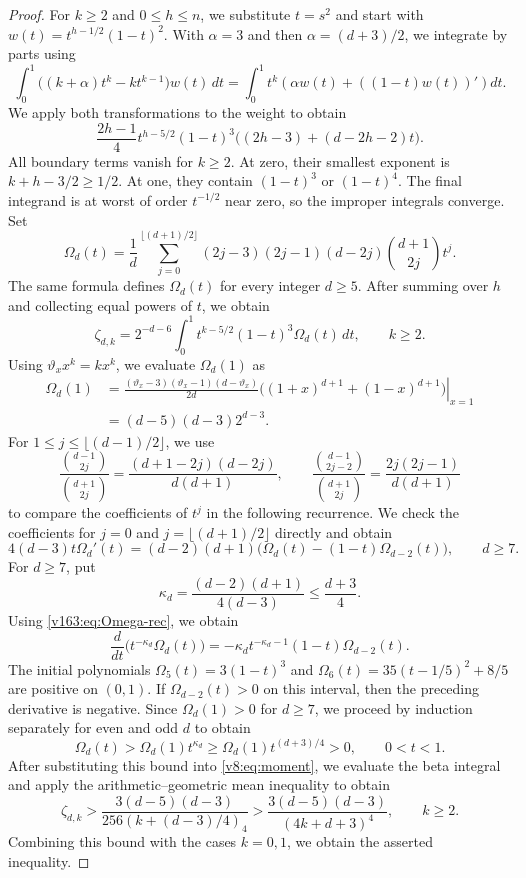 \documentclass[11pt]{article}
\numberwithin{equation}{section}
\theoremstyle{remark}\newtheorem{remark}[theorem]{Remark}
\newcommand{\varthetax}{\vartheta_x}
\begin{document}
\begin{proof}
For $k\ge2$ and $0\le h\le n$, we substitute $t=s^2$ and start with
$w(t)=t^{h-1/2}(1-t)^2$. With $\alpha=3$ and then $\alpha=(d+3)/2$,
we integrate by parts using
\[
 \int_0^1\bigl((k+\alpha)t^k-kt^{k-1}\bigr)w(t)\,dt
 =\int_0^1t^k\left(\alpha w(t)+((1-t)w(t))'\right)dt.
\]
We apply both transformations to the weight to obtain
\[
 \frac{2h-1}{4}t^{h-5/2}(1-t)^3
 \bigl((2h-3)+(d-2h-2)t\bigr).
\]
All boundary terms vanish for $k\ge2$. At zero, their smallest
exponent is $k+h-3/2\ge1/2$. At one, they contain $(1-t)^3$ or
$(1-t)^4$. The final integrand is at worst of order $t^{-1/2}$
near zero, so the improper integrals converge. Set
\[
 \Omega_d(t)=\frac1d\sum_{j=0}^{\lfloor(d+1)/2\rfloor}
 (2j-3)(2j-1)(d-2j)\binom{d+1}{2j}t^j.
\]
The same formula defines $\Omega_d(t)$ for every integer $d\ge5$.
After summing over $h$ and collecting equal powers of $t$, we obtain
\begin{equation}\label{v8:eq:moment}
 \zeta_{d,k}=2^{-d-6}\int_0^1t^{k-5/2}(1-t)^3\Omega_d(t)\,dt,
 \qquad k\ge2.
\end{equation}
Using $\varthetax x^k=kx^k$, we evaluate $\Omega_d(1)$ as
\[
\begin{aligned}
 \Omega_d(1)
 &=\left.\frac{(\varthetax-3)(\varthetax-1)(d-\varthetax)}{2d}
 \bigl((1+x)^{d+1}+(1-x)^{d+1}\bigr)\right|_{x=1}\\
 &=(d-5)(d-3)2^{d-3}.
\end{aligned}
\]
For $1\le j\le\lfloor(d-1)/2\rfloor$, we use
\[
 \frac{\binom{d-1}{2j}}{\binom{d+1}{2j}}
 =\frac{(d+1-2j)(d-2j)}{d(d+1)},\qquad
 \frac{\binom{d-1}{2j-2}}{\binom{d+1}{2j}}
 =\frac{2j(2j-1)}{d(d+1)}
\]
to compare the coefficients of $t^j$ in the following recurrence. We check
the coefficients for $j=0$ and $j=\lfloor(d+1)/2\rfloor$ directly and obtain
\begin{equation}\label{v163:eq:Omega-rec}
 4(d-3)t\Omega_d'(t)
 =(d-2)(d+1)\bigl(\Omega_d(t)-(1-t)\Omega_{d-2}(t)\bigr),
 \qquad d\ge7.
\end{equation}
For $d\ge7$, put
\[
 \kappa_d=\frac{(d-2)(d+1)}{4(d-3)}\le\frac{d+3}4.
\]
Using \eqref{v163:eq:Omega-rec}, we obtain
\[
 \frac{d}{dt}\bigl(t^{-\kappa_d}\Omega_d(t)\bigr)
 =-\kappa_d t^{-\kappa_d-1}(1-t)\Omega_{d-2}(t).
\]
The initial polynomials $\Omega_5(t)=3(1-t)^3$ and
$\Omega_6(t)=35(t-1/5)^2+8/5$ are positive on $(0,1)$.
If $\Omega_{d-2}(t)>0$ on this interval, then the preceding derivative
is negative. Since $\Omega_d(1)>0$ for $d\ge7$, we proceed by induction
separately for even and odd $d$ to obtain
\[
 \Omega_d(t)>\Omega_d(1)t^{\kappa_d}
 \ge\Omega_d(1)t^{(d+3)/4}>0,\qquad 0<t<1.
\]
After substituting this bound into \eqref{v8:eq:moment}, we evaluate
the beta integral and apply the arithmetic--geometric mean inequality
to obtain
\[
 \zeta_{d,k}>
 \frac{3(d-5)(d-3)}{256(k+(d-3)/4)_4}
 >\frac{3(d-5)(d-3)}{(4k+d+3)^4},\qquad k\ge2.
\]
Combining this bound with the cases $k=0,1$, we obtain the asserted inequality.
\end{proof}
\end{document}
